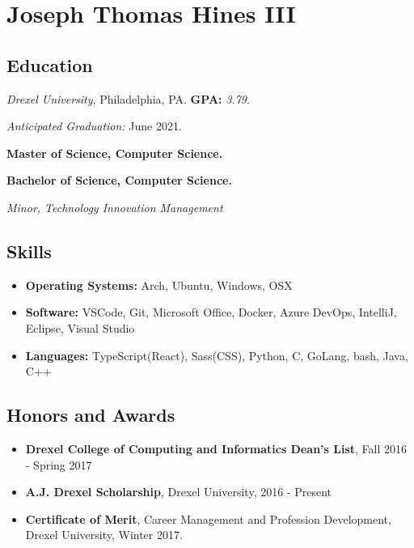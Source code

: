 \documentclass[10pt]{article}
\begin{document}
\section*{\huge Joseph Thomas Hines III}
\label{sec:title}

\begin{multicols}{2}
\subsection*{Education}%
\label{sub:Education}

\emph{Drexel University}, Philadelphia, PA. \textbf{GPA:} \emph{3.79}.

\emph{Anticipated Graduation:} June 2021.

\null

\textbf{Master of Science, Computer Science.}

\textbf{Bachelor of Science, Computer Science.}

\emph{Minor, Technology Innovation Management}

\subsection*{Skills}%
\label{sub:Skills}

\begin{itemize}
\setlength\itemsep{0.5em}
\item \textbf{Operating Systems:} Arch, Ubuntu, Windows, OSX
\item \textbf{Software:} VSCode, Git, Microsoft Office, Docker, Azure DevOps,
	IntelliJ, Eclipse, Visual Studio
\item \textbf{Languages:} TypeScript(React), Sass(CSS), Python, C, GoLang,
	bash, Java, C++
\end{itemize}

\subsection*{Honors and Awards}%
\label{sub:Honors and Awards}

\begin{itemize}
\setlength\itemsep{1em}
\item \textbf{Drexel College of Computing and Informatics Dean's List},
	Fall 2016 - Spring 2017
\item \textbf{A.J. Drexel Scholarship}, Drexel University, 2016 - Present
\item \textbf{Certificate of Merit}, Career Management and Profession Development, Drexel University, Winter 2017.
\end{itemize}


\end{multicols}
\end{document}
